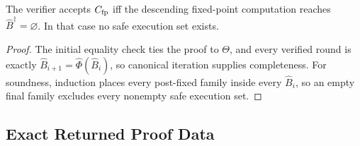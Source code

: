 \begin{lemma}
The verifier accepts \(C_{\rm fp}\) iff the descending fixed-point computation reaches \(\widehat B^\dagger=\varnothing\).
In that case no safe execution set exists.
\end{lemma}
\begin{proof}
The initial equality check ties the proof to \(\Theta\), and every verified round is exactly \(\widehat B_{i+1}=\widehat\Phi(\widehat B_i)\), so canonical iteration supplies completeness.
For soundness, induction places every post-fixed family inside every \(\widehat B_i\), so an empty final family excludes every nonempty safe execution set.
\end{proof}

\subsection{Exact Returned Proof Data}
\label{app:returned-data}

